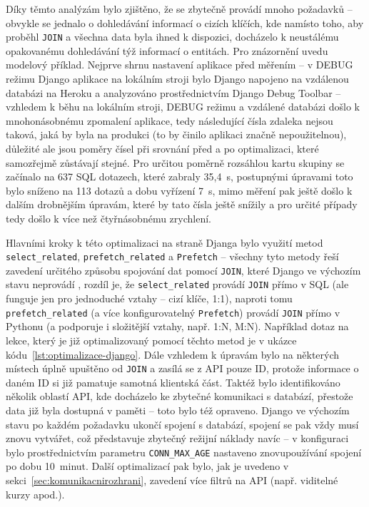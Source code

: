 Díky těmto analýzám bylo zjištěno, že se zbytečně provádí mnoho požadavků -- obvykle se jednalo o dohledávání informací o cizích klíčích, kde namísto toho, aby proběhl \verb|JOIN| a všechna data byla ihned k dispozici, docházelo k neustálému opakovanému dohledávání týž informací o entitách. Pro znázornění uvedu modelový příklad. Nejprve shrnu nastavení aplikace před měřením -- v DEBUG režimu Django aplikace na lokálním stroji bylo Django napojeno na vzdálenou databázi na Heroku a analyzováno prostřednictvím Django Debug Toolbar -- vzhledem k běhu na lokálním stroji, DEBUG režimu a vzdálené databázi došlo k mnohonásobnému zpomalení aplikace, tedy následující čísla zdaleka nejsou taková, jaká by byla na produkci (to by činilo aplikaci značně nepoužitelnou), důležité ale jsou poměry čísel při srovnání před a po optimalizaci, které samozřejmě zůstávají stejné. Pro určitou poměrně rozsáhlou kartu skupiny se začínalo na 637 SQL dotazech, které zabraly 35,4~s, postupnými úpravami toto bylo sníženo na 113 dotazů a dobu vyřízení 7~s, mimo měření pak ještě došlo k dalším drobnějším úpravám, které by tato čísla ještě snížily a pro určité případy tedy došlo k více než čtyřnásobnému zrychlení.

Hlavními kroky k této optimalizaci na straně Djanga bylo využití metod \verb|select_related|, \verb|prefetch_related| a \verb|Prefetch| -- všechny tyto metody řeší zavedení určitého způsobu spojování dat pomocí \verb|JOIN|, které Django ve výchozím stavu neprovádí \cite{django-optimalizace}, rozdíl je, že \verb|select_related| provádí \verb|JOIN| přímo v SQL (ale funguje jen pro jednoduché vztahy -- cizí klíče, 1:1), naproti tomu \verb|prefetch_related| (a více konfigurovatelný \verb|Prefetch|) provádí \verb|JOIN| přímo v Pythonu (a podporuje i složitější vztahy, např. 1:N, M:N). Například dotaz na lekce, který je již optimalizovaný pomocí těchto metod je v ukázce kódu~\ref{lst:optimalizace-django}. Dále vzhledem k úpravám bylo na některých místech úplně upuštěno od \verb|JOIN| a zasílá se z API pouze ID, protože informace o daném ID si již pamatuje samotná klientská část. Taktéž bylo identifikováno několik oblastí API, kde docházelo ke zbytečné komunikaci s databází, přestože data již byla dostupná v paměti -- toto bylo též opraveno. Django ve výchozím stavu po každém požadavku ukončí spojení s databází, spojení se pak vždy musí znovu vytvářet, což představuje zbytečný režijní náklady navíc \cite{django-db} -- v konfiguraci bylo prostřednictvím parametru \verb|CONN_MAX_AGE| nastaveno znovupoužívání spojení po dobu 10~minut. Další optimalizací pak bylo, jak je uvedeno v sekci~\ref{sec:komunikacnirozhrani}, zavedení více filtrů na API (např. viditelné kurzy apod.).

